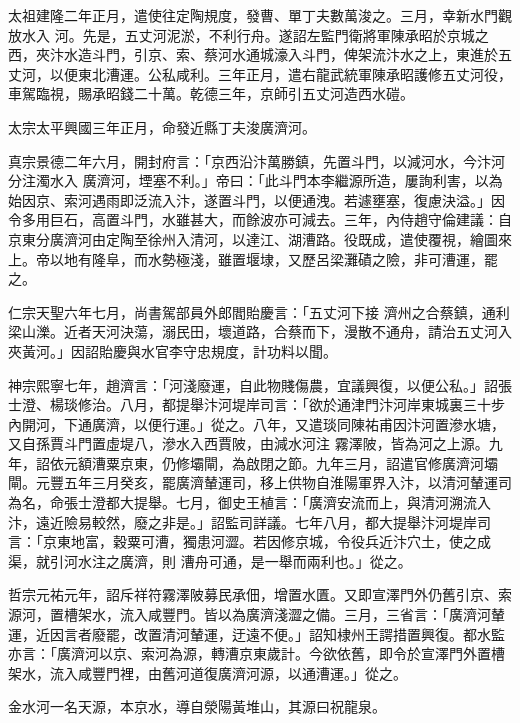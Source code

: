 \begin{pinyinscope}
 太祖建隆二年正月，遣使往定陶規度，發曹、單丁夫數萬浚之。三月，幸新水門觀放水入
 河。先是，五丈河泥淤，不利行舟。遂詔左監門衛將軍陳承昭於京城之西，夾汴水造斗門，引京、索、蔡河水通城濠入斗門，俾架流汴水之上，東進於五丈河，以便東北漕運。公私咸利。三年正月，遣右龍武統軍陳承昭護修五丈河役，車駕臨視，賜承昭錢二十萬。乾德三年，京師引五丈河造西水磑。



 太宗太平興國三年正月，命發近縣丁夫浚廣濟河。



 真宗景德二年六月，開封府言：「京西沿汴萬勝鎮，先置斗門，以減河水，今汴河分注濁水入
 廣濟河，堙塞不利。」帝曰：「此斗門本李繼源所造，屢詢利害，以為始因京、索河遇雨即泛流入汴，遂置斗門，以便通洩。若遽壅塞，復慮決溢。」因令多用巨石，高置斗門，水雖甚大，而餘波亦可減去。三年，內侍趙守倫建議：自京東分廣濟河由定陶至徐州入清河，以達江、湖漕路。役既成，遣使覆視，繪圖來上。帝以地有隆阜，而水勢極淺，雖置堰埭，又歷呂梁灘磧之險，非可漕運，罷之。



 仁宗天聖六年七月，尚書駕部員外郎閻貽慶言：「五丈河下接
 濟州之合蔡鎮，通利梁山濼。近者天河決蕩，溺民田，壞道路，合蔡而下，漫散不通舟，請治五丈河入夾黃河。」因詔貽慶與水官李守忠規度，計功料以聞。



 神宗熙寧七年，趙濟言：「河淺廢運，自此物賤傷農，宜議興復，以便公私。」詔張士澄、楊琰修治。八月，都提舉汴河堤岸司言：「欲於通津門汴河岸東城裏三十步內開河，下通廣濟，以便行運。」從之。八年，又遣琰同陳祐甫因汴河置滲水塘，又自孫賈斗門置虛堤八，滲水入西賈陂，由減水河注
 霧澤陂，皆為河之上源。九年，詔依元額漕粟京東，仍修壩閘，為啟閉之節。九年三月，詔遣官修廣濟河壩閘。元豐五年三月癸亥，罷廣濟輦運司，移上供物自淮陽軍界入汴，以清河輦運司為名，命張士澄都大提舉。七月，御史王植言：「廣濟安流而上，與清河溯流入汴，遠近險易較然，廢之非是。」詔監司詳議。七年八月，都大提舉汴河堤岸司言：「京東地富，穀粟可漕，獨患河澀。若因修京城，令役兵近汴穴土，使之成渠，就引河水注之廣濟，則
 漕舟可通，是一舉而兩利也。」從之。



 哲宗元祐元年，詔斥祥符霧澤陂募民承佃，增置水匱。又即宣澤門外仍舊引京、索源河，置槽架水，流入咸豐門。皆以為廣濟淺澀之備。三月，三省言：「廣濟河輦運，近因言者廢罷，改置清河輦運，迂遠不便。」詔知棣州王諤措置興復。都水監亦言：「廣濟河以京、索河為源，轉漕京東歲計。今欲依舊，即令於宣澤門外置槽架水，流入咸豐門裡，由舊河道復廣濟河源，以通漕運。」從之。



 金水河一名天源，本京水，導自滎陽黃堆山，其源曰祝龍泉。




\end{pinyinscope}
